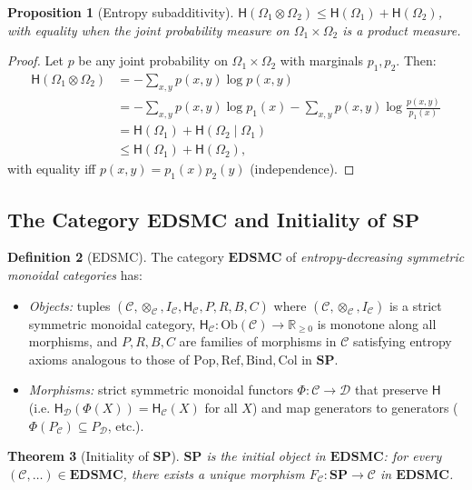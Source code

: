 \documentclass[12pt,a4paper]{article}
\newtheorem{theorem}{Theorem}[section]
\newtheorem{proposition}[theorem]{Proposition}
\theoremstyle{definition}
\newtheorem{definition}[theorem]{Definition}
\theoremstyle{remark}
\newcommand{\Rnn}{\mathbb{R}_{\ge 0}}
\newcommand{\Ent}{\mathsf{H}}
\newcommand{\SP}{\mathbf{SP}}
\newcommand{\EDSMC}{\mathbf{EDSMC}}
\newcommand{\Ob}{\mathrm{Ob}}
\newcommand{\Pop}{\mathrm{Pop}}
\newcommand{\Ref}{\mathrm{Ref}}
\newcommand{\Bind}{\mathrm{Bind}}
\newcommand{\Col}{\mathrm{Col}}
\newcommand{\tensor}{\otimes}
\newcommand{\unit}{I}
\begin{document}
\begin{proposition}[Entropy subadditivity]
\label{prop:subadditive}
$\Ent(\Omega_1\tensor\Omega_2)\le\Ent(\Omega_1)+\Ent(\Omega_2)$, with equality when
the joint probability measure on $\Omega_1\times\Omega_2$ is a product measure.
\end{proposition}

\begin{proof}
Let $p$ be any joint probability on $\Omega_1\times\Omega_2$ with marginals $p_1,p_2$.
Then:
\begin{align*}
\Ent(\Omega_1\tensor\Omega_2)
&= -\sum_{x,y}p(x,y)\log p(x,y)\\
&= -\sum_{x,y}p(x,y)\log p_1(x)
  -\sum_{x,y}p(x,y)\log\frac{p(x,y)}{p_1(x)}\\
&= \Ent(\Omega_1) + \Ent(\Omega_2\mid\Omega_1)\\
&\le \Ent(\Omega_1)+\Ent(\Omega_2),
\end{align*}
with equality iff $p(x,y)=p_1(x)p_2(y)$ (independence).
\end{proof}

\subsection{The Category \texorpdfstring{$\EDSMC$}{EDSMC} and Initiality of \texorpdfstring{$\SP$}{SP}}

\begin{definition}[EDSMC]
\label{def:edsmc}
The category $\EDSMC$ of \emph{entropy-decreasing symmetric monoidal categories}
has:
\begin{itemize}
\item \textit{Objects:} tuples $(\mathcal{C},\tensor_\mathcal{C},\unit_\mathcal{C},
  \Ent_\mathcal{C},P,R,B,C)$ where $(\mathcal{C},\tensor_\mathcal{C},\unit_\mathcal{C})$
  is a strict symmetric monoidal category, $\Ent_\mathcal{C}:\Ob(\mathcal{C})\to\Rnn$
  is monotone along all morphisms, and $P,R,B,C$ are families of morphisms in
  $\mathcal{C}$ satisfying entropy axioms analogous to those of
  $\Pop,\Ref,\Bind,\Col$ in $\SP$.
\item \textit{Morphisms:} strict symmetric monoidal functors
  $\Phi:\mathcal{C}\to\mathcal{D}$ that preserve $\Ent$ (i.e.
  $\Ent_\mathcal{D}(\Phi(X))=\Ent_\mathcal{C}(X)$ for all $X$) and map generators
  to generators ($\Phi(P_\mathcal{C})\subseteq P_\mathcal{D}$, etc.).
\end{itemize}
\end{definition}

\begin{theorem}[Initiality of $\SP$]
\label{thm:initial}
$\SP$ is the initial object in $\EDSMC$: for every $(\mathcal{C},\ldots)\in\EDSMC$,
there exists a unique morphism $F_\mathcal{C}:\SP\to\mathcal{C}$ in $\EDSMC$.
\end{theorem}
\end{document}
